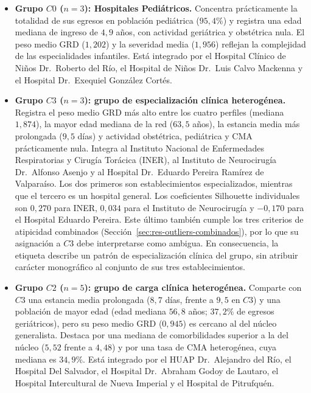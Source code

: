 \begin{itemize}
    \item \textbf{Grupo $C0$ ($n=3$): Hospitales Pediátricos.} Concentra
    prácticamente la totalidad de sus egresos en población pediátrica
    ($95{,}4\%$) y registra una edad mediana de ingreso de $4{,}9$ años, con
    actividad geriátrica y obstétrica nula. El peso medio GRD ($1{,}202$) y la
    severidad media ($1{,}956$) reflejan la complejidad de las especialidades
    infantiles. Está integrado por el Hospital Clínico de Niños Dr.\ Roberto del
    Río, el Hospital de Niños Dr.\ Luis Calvo Mackenna y el Hospital Dr.\
    Exequiel González Cortés.

    \item \textbf{Grupo $C3$ ($n=3$): grupo de especialización clínica
    heterogénea.} Registra el peso medio GRD más alto entre los cuatro perfiles
    (mediana $1{,}874$), la mayor edad mediana de la red ($63{,}5$ años), la
    estancia media más prolongada ($9{,}5$ días) y actividad obstétrica,
    pediátrica y CMA prácticamente nula. Integra al Instituto Nacional de Enfermedades Respiratorias y Cirugía
    Torácica (INER), al Instituto de Neurocirugía Dr.\ Alfonso Asenjo y al
    Hospital Dr.\ Eduardo Pereira Ramírez de Valparaíso. Los dos primeros son
    establecimientos especializados, mientras que el tercero es un hospital
    general. Los coeficientes Silhouette individuales son $0{,}270$ para INER,
    $0{,}034$ para el Instituto de Neurocirugía y $-0{,}170$ para el Hospital
    Eduardo Pereira. Este último también cumple los tres criterios de atipicidad
    combinados (Sección~\ref{sec:res-outliers-combinados}), por lo que su
    asignación a $C3$ debe interpretarse como ambigua. En consecuencia, la
    etiqueta describe un patrón de especialización clínica del grupo, sin
    atribuir carácter monográfico al conjunto de sus tres establecimientos.

    \item \textbf{Grupo $C2$ ($n=5$): grupo de carga clínica heterogénea.}
    Comparte con $C3$ una estancia media prolongada ($8{,}7$ días, frente a
    $9{,}5$ en $C3$) y una población de mayor edad (edad mediana $56{,}8$ años;
    $37{,}2\%$ de egresos geriátricos), pero su peso medio GRD ($0{,}945$) es
    cercano al del núcleo generalista. Destaca por una mediana de comorbilidades
    superior a la del núcleo ($5{,}52$ frente a $4{,}48$) y por una tasa de CMA
    heterogénea, cuya mediana es $34{,}9\%$. Está integrado por el HUAP Dr.\ Alejandro del Río,
    el Hospital Del Salvador, el Hospital Dr.\ Abraham Godoy de Lautaro, el
    Hospital Intercultural de Nueva Imperial y el Hospital de Pitrufquén.


\end{itemize}
